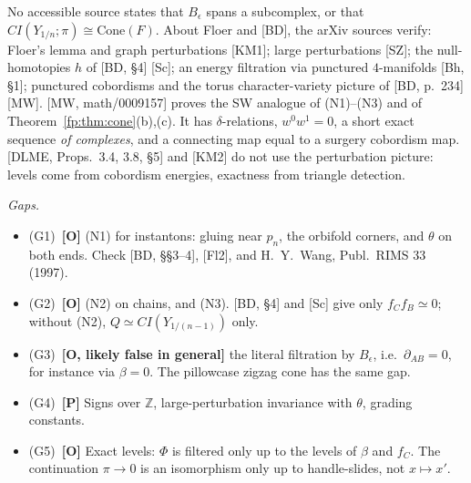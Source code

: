 \begin{remark}\label{fp:rem:gaps}
No accessible source states that $B_\epsilon$ spans a subcomplex, or that $\mathit{CI}(Y_{1/n};\pi)\cong\mathrm{Cone}(F)$.
About Floer and [BD], the arXiv sources verify: Floer's lemma and graph perturbations [KM1]; large perturbations
[SZ]; the null-homotopies $h$ of [BD, \S4] [Sc]; an energy filtration via punctured $4$-manifolds [Bh, \S1]; punctured
cobordisms and the torus character-variety picture of [BD, p.~234] [MW].  [MW, math/0009157] proves the SW analogue of (N1)--(N3) and of Theorem~\ref{fp:thm:cone}(b),(c).  It has $\delta$-relations,
$w^0w^1=0$, a short exact sequence \emph{of complexes}, and a connecting map equal to a surgery cobordism map.
[DLME, Props.~3.4, 3.8, \S5] and [KM2] do not use the perturbation picture: levels come from cobordism energies,
exactness from triangle detection.

\emph{Gaps.}
\begin{itemize}
\item (G1)~\textbf{[O]} (N1) for instantons: gluing near $p_n$, the orbifold corners, and $\theta$ on both ends.  Check
[BD, \S\S3--4], [Fl2], and H.~Y.~Wang, Publ.\ RIMS 33 (1997).
\item (G2)~\textbf{[O]} (N2) on chains, and (N3).  [BD, \S4] and [Sc] give only $f_Cf_B\simeq0$; without (N2),
$Q\simeq\mathit{CI}(Y_{1/(n-1)})$ only.
\item (G3)~\textbf{[O, likely false in general]} the literal filtration by $B_\epsilon$, i.e.\ $\partial_{AB}=0$, for instance via $\beta=0$.  The pillowcase zigzag
cone has the same gap.
\item (G4)~\textbf{[P]} Signs over $\mathbb Z$, large-perturbation invariance with $\theta$, grading constants.
\item (G5)~\textbf{[O]} Exact levels: $\Phi$ is filtered only up to the levels of $\beta$ and $f_C$.  The continuation
$\pi\to0$ is an isomorphism only up to handle-slides, not $x\mapsto x'$.
\end{itemize}
\end{remark}
